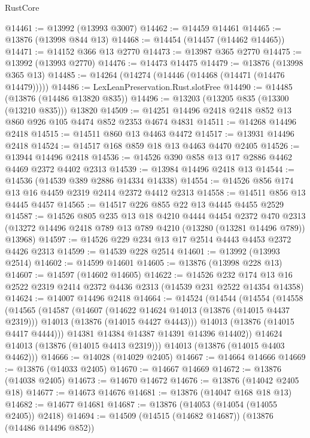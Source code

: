 \begin{lexlean}{RustCore}
\begin{coremodule}
@14461 := @13992 (@13993 @3007)
@14462 := @14459 @14461
@14465 := @13876 (@13998 @844 @13)
@14468 := @14454 (@14457 (@14462 @14465))
@14471 := @14152 @366 @13 @2770
@14473 := @13987 @365 @2770
@14475 := @13992 (@13993 @2770)
@14476 := @14473 @14475
@14479 := @13876 (@13998 @365 @13)
@14485 := @14264 (@14274 (@14446 (@14468 (@14471 (@14476 @14479)))))
@14486 := LexLeanPreservation.Rust.slotFree
@14490 := @14485 (@13876 (@14486 @13820 @835))
@14496 := @13203 (@13205 @835 (@13300 (@13210 @835))) @13820
@14509 := @14251 @14496 @2418 @2418 @852 @13 @860 @926 @105 @4474 @852 @2353 @4674 @4831
@14511 := @14268 @14496 @2418
@14515 := @14511 @860 @13 @4463 @4472
@14517 := @13931 @14496 @2418
@14524 := @14517 @168 @859 @18 @13 @4463 @4470 @2405
@14526 := @13944 @14496 @2418
@14536 := @14526 @390 @858 @13 @17 @2886 @4462 @4469 @2372 @4402 @2313
@14539 := @13984 @14496 @2418 @13
@14544 := @14536 (@14539 @389 @2886 @14334 @14338)
@14554 := @14526 @856 @174 @13 @16 @4459 @2319 @2414 @2372 @4412 @2313
@14558 := @14511 @856 @13 @4445 @4457
@14565 := @14517 @226 @855 @22 @13 @4445 @4455 @2529
@14587 := @14526
    @805
    @235
    @13
    @18
    @4210
    @4444
    @4454
    @2372
    @470
    @2313
    (@13272 @14496 @2418 @789 @13 @789 @4210 (@13280 (@13281 @14496 @789)) @13968)
@14597 := @14526 @229 @234 @13 @17 @2514 @4443 @4453 @2372 @4426 @2313
@14599 := @14539 @228 @2514
@14601 := @13992 (@13993 @2514)
@14602 := @14599 @14601
@14605 := @13876 (@13998 @228 @13)
@14607 := @14597 (@14602 @14605)
@14622 := @14526
    @232
    @174
    @13
    @16
    @2522
    @2319
    @2414
    @2372
    @4436
    @2313
    (@14539 @231 @2522 @14354 @14358)
@14624 := @14007 @14496 @2418
@14664 := @14524
    (@14544
      (@14554
        (@14558
          (@14565
            (@14587
              (@14607
                (@14622 @14624 @14013 (@13876 (@14015 @4437 @2319)))
                @14013
                (@13876 (@14015 @4427 @4443)))
              @14013
              (@13876 (@14015 @4417 @4444)))
            @14381
            @14384
            @14387
            @14391
            @14396
            @14402))
        @14624
        @14013
        (@13876 (@14015 @4413 @2319)))
      @14013
      (@13876 (@14015 @4403 @4462)))
@14666 := @14028 (@14029 @2405)
@14667 := @14664 @14666
@14669 := @13876 (@14033 @2405)
@14670 := @14667 @14669
@14672 := @13876 (@14038 @2405)
@14673 := @14670 @14672
@14676 := @13876 (@14042 @2405 @18)
@14677 := @14673 @14676
@14681 := @13876 (@14047 @168 @18 @13)
@14682 := @14677 @14681
@14687 := @13876 (@14053 (@14054 (@14055 @2405)) @2418)
@14694 := @14509 (@14515 (@14682 @14687)) (@13876 (@14486 @14496 @852))

\end{coremodule}
\end{lexlean}
